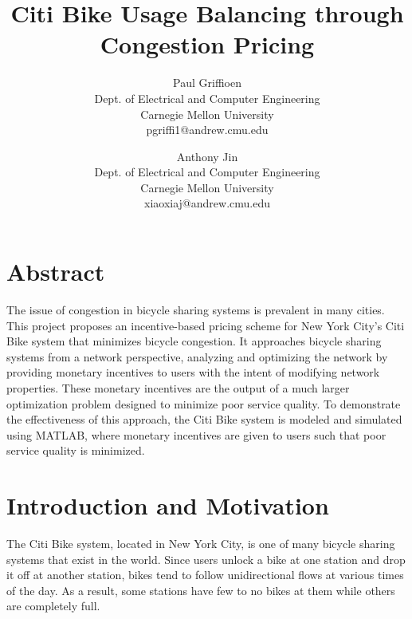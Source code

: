 \documentclass[times, 10pt,twocolumn]{article}
\begin{document}
\title{Citi Bike Usage Balancing through Congestion Pricing}

\author{Paul Griffioen\\Dept. of Electrical and Computer Engineering\\Carnegie Mellon University\\ pgriffi1@andrew.cmu.edu\\
\and
Anthony Jin\\Dept. of Electrical and Computer Engineering\\Carnegie Mellon University\\xiaoxiaj@andrew.cmu.edu\\
}

\maketitle
\thispagestyle{empty}

\section{Abstract}

The issue of congestion in bicycle sharing systems is prevalent in many cities. This project proposes an incentive-based pricing scheme for New York City's Citi Bike system that minimizes bicycle congestion. It approaches bicycle sharing systems from a network perspective, analyzing and optimizing the network by providing monetary incentives to users with the intent of modifying network properties. These monetary incentives are the output of a much larger optimization problem designed to minimize poor service quality. To demonstrate the effectiveness of this approach, the Citi Bike system is modeled and simulated using MATLAB, where monetary incentives are given to users such that poor service quality is minimized.

\section{Introduction and Motivation}

The Citi Bike system, located in New York City, is one of many bicycle sharing systems that exist in the world. Since users unlock a bike at one station and drop it off at another station, bikes tend to follow unidirectional flows at various times of the day. As a result, some stations have few to no bikes at them while others are completely full.
\end{document}
